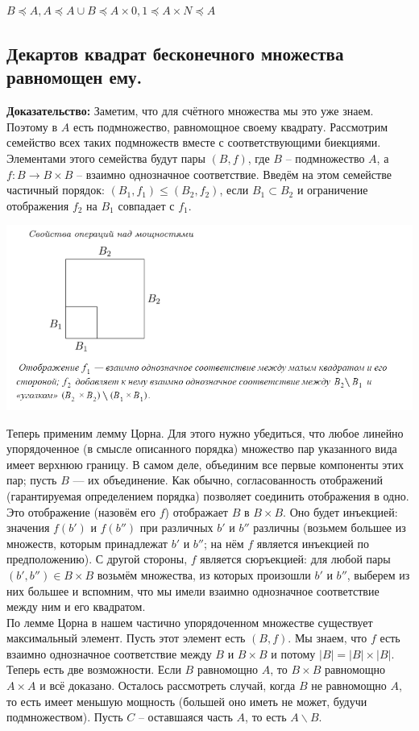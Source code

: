 $B \preceq A, A \preceq A \cup B \preceq A \times {0, 1} \preceq A \times N \preceq A$

\subsection{Декартов квадрат бесконечного множества равномощен ему.}

\textbf{Доказательство: } Заметим, что для счётного множества мы это уже знаем. Поэтому в $A$ есть подмножество, равномощное своему квадрату. Рассмотрим семейство всех таких подмножеств вместе с соответствующими биекциями. Элементами этого семейства будут пары $(B, f)$, где $B$ -- подмножество $A$, а $f: B \to B \times B$ -- взаимно однозначное соответствие. Введём на этом семействе частичный порядок: $(B_1, f_1) \leq (B_2, f_2)$, если $B_1 \subset B_2$ и ограничение отображения $f_2$ на $B_1$ совпадает с $f_1$.

\includegraphics{images/2.12 1.png}

Теперь применим лемму Цорна. Для этого нужно убедиться, что любое линейно упорядоченное (в смысле описанного порядка) множество пар указанного вида имеет верхнюю границу. В самом деле, объединим все первые компоненты этих пар; пусть $B$ — их объединение. Как обычно, согласованность отображений (гарантируемая определением порядка) позволяет соединить отображения в одно. Это отображение (назовём его $f$) отображает $B$ в $B \times B$. Оно будет инъекцией: значения $f(b')$ и $f(b'')$ при различных $b'$ и $b''$ различны (возьмем большее из множеств, которым принадлежат $b'$ и $b''$; на нём $f$ является инъекцией по предположению). С другой стороны, $f$ является сюръекцией: для любой пары $(b', b'') \in B \times B$ возьмём множества, из которых произошли $b'$ и $b''$, выберем из них большее и вспомним, что мы имели взаимно однозначное соответствие между ним и его квадратом.\\

По лемме Цорна в нашем частично упорядоченном множестве существует максимальный элемент. Пусть этот элемент есть $(B, f)$. Мы знаем, что $f$ есть взаимно однозначное соответствие между $B$ и $B \times B$ и потому $|B| = |B| \times |B|$. Теперь есть две возможности. Если $B$ равномощно $A$, то $B \times B$ равномощно $A \times A$ и всё доказано. Осталось рассмотреть случай, когда $B$ не равномощно $A$, то есть имеет меньшую мощность (большей оно иметь не может, будучи подмножеством). Пусть $C$ -- оставшаяся часть $A$, то есть $A \backslash B$.

